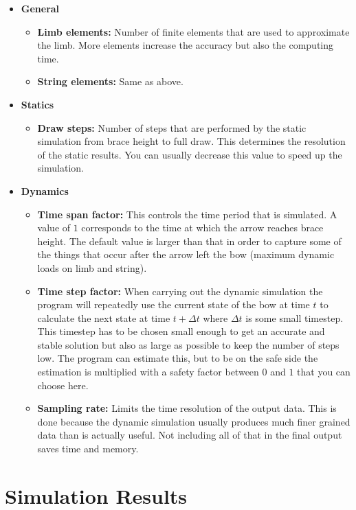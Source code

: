 \documentclass[12pt]{article}
\begin{document}
\begin{itemize}
\item \textbf{General}
    \begin{itemize}
    \item \textbf{Limb elements:} Number of finite elements that are used to approximate the limb. More elements increase the accuracy but also the computing time.
    \item \textbf{String elements:} Same as above.
    \end{itemize}
\item \textbf{Statics}
    \begin{itemize}
    \item \textbf{Draw steps:} Number of steps that are performed by the static simulation from brace height to full draw. This determines the resolution of the static results. You can usually decrease this value to speed up the simulation.
    \end{itemize}
\item \textbf{Dynamics}
    \begin{itemize}
    \item \textbf{Time span factor:} This controls the time period that is simulated. A value of $1$ corresponds to the time at which the arrow reaches brace height. The default value is larger than that in order to capture some of the things that occur after the arrow left the bow (maximum dynamic loads on limb and string).
    \item \textbf{Time step factor:} When carrying out the dynamic simulation the program will repeatedly use the current state of the bow at time $t$ to calculate the next state at time $t + \Delta t$ where $\Delta t$ is some small timestep. This timestep has to be chosen small enough to get an accurate and stable solution but also as large as possible to keep the number of steps low. The program can estimate this, but to be on the safe side the estimation is multiplied with a safety factor between $0$ and $1$ that you can choose here.
    \item \textbf{Sampling rate:} Limits the time resolution of the output data. This is done because the dynamic simulation usually produces much finer grained data than is actually useful. Not including all of that in the final output saves time and memory.
    \end{itemize}
\end{itemize}

\newpage
\section{Simulation Results}
\end{document}
